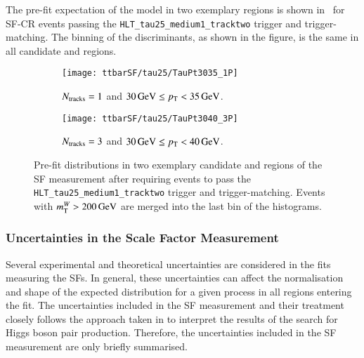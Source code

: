 The pre-fit expectation of the model in two exemplary regions is shown
in~ for SF-CR events passing the
\verb|HLT_tau25_medium1_tracktwo| trigger and trigger-matching. The binning of
the \mTW discriminants, as shown in the figure, is the same in all \tauhadvis
candidate \pT and \Ntracks regions.

\begin{figure}[htbp]
  \centering

  \begin{subfigure}{.485\textwidth}
    \texttt{[image: ttbarSF/tau25/TauPt3035\_1P]}
    \caption{$N_{\text{tracks}} = 1$ and $\SI{30}{\ensuremath{\text{GeV}}} \leq p_{\text{T}} < \SI{35}{\ensuremath{\text{GeV}}}$.}
  \end{subfigure}\hfill%
  \begin{subfigure}{.485\textwidth}
    \texttt{[image: ttbarSF/tau25/TauPt3040\_3P]}
    \caption{$N_{\text{tracks}} = 3$ and $\SI{30}{\GeV} \leq \pT < \SI{40}{\GeV}$.}
  \end{subfigure}

  \caption{Pre-fit \mTW distributions in two exemplary \tauhadvis candidate
    \Ntracks and \pT regions of the SF measurement after requiring events to
    pass the \texttt{HLT\_tau25\_medium1\_tracktwo} trigger and
    trigger-matching. Events with $m_{\text{T}}^W > \SI{200}{\ensuremath{\text{GeV}}}$ are merged into the
    last bin of the histograms.}%
  \label{fig:ttbarsf_mtw_examples_prefit}
\end{figure}


\subsubsection{Uncertainties in the Scale Factor Measurement}

Several experimental and theoretical uncertainties are considered in the fits
measuring the SFs. In general, these uncertainties can affect the normalisation
and shape of the expected \mTW distribution for a given process in all regions
entering the fit. The uncertainties included in the SF measurement and their
treatment closely follows the approach taken in
 to interpret the results of
the search for Higgs boson pair production. Therefore, the uncertainties
included in the SF measurement are only briefly summarised.

